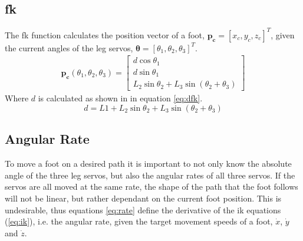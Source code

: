    \subsection{\acf{fk}}
        The \ac{fk} function calculates the position vector of a foot, \(\boldsymbol{p_c} = [x_c,y_c,z_c]^T\),
        given the current angles of the leg servos, \(\boldsymbol{\theta} = [\theta_1, \theta_2, \theta_3]^T\).
        \begin{align}
            \boldsymbol{p_c}(\theta_1,\theta_2,\theta_3) =
                            \begin{bmatrix}
                                d\cos{\theta_1}\\
                                d\sin{\theta_1}\\
                                L_2\sin{\theta_2} + L_3\sin{\left(\theta_2 + \theta_3\right)}
                            \end{bmatrix}
        \end{align}
        Where \(d\) is calculated as shown in in equation \ref{eq:dfk}.
        \begin{equation}\label{eq:dfk}
            d = L1 + L_2\sin{\theta_2} + L_3\sin{(\theta_2 + \theta_3)}
        \end{equation}
    
    \subsection{Angular Rate}
    To move a foot on a desired path it is important to not only know the absolute angle of the three leg servos, but also the angular rates of all three
    servos. If the servos are all moved at the same rate, the shape of the path that the foot follows will not be linear, but rather dependant on the
    current foot position. This is undesirable, thus equations \ref{eq:rate} define the derivative of the \ac{ik} equations (\ref{eq:ik}), i.e. the angular
    rate, given the target movement speeds of a foot, \(\dot{x}\), \(\dot{y}\) and \(\dot{z}\).


